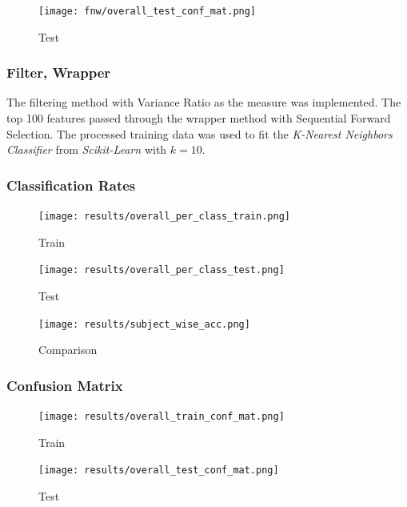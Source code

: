 \documentclass[12pt,twoside,a4paper]{article}
\begin{document}
\begin{figure}[H]
    \centering
    \texttt{[image: fnw/overall\_test\_conf\_mat.png]}
    \caption{Test}
    \label{fig: F5}
\end{figure}

\subsubsection{Filter, Wrapper}

The filtering method with Variance Ratio as the measure was implemented. The top 100 features passed through the wrapper method with Sequential Forward Selection. The processed training data was used to fit the \textit{K-Nearest Neighbors Classifier} from \textit{Scikit-Learn} with $k=10$.

\subsubsection*{Classification Rates}

\begin{figure}[H]
    \centering
    \texttt{[image: results/overall\_per\_class\_train.png]}
    \caption{Train}
    \label{fig: FW1}
\end{figure}

\begin{figure}[H]
    \centering
    \texttt{[image: results/overall\_per\_class\_test.png]}
    \caption{Test}
    \label{fig: FW2}
\end{figure}

\begin{figure}[H]
    \centering
    \texttt{[image: results/subject\_wise\_acc.png]}
    \caption{Comparison}
    \label{fig: FW3}
\end{figure}

\subsubsection*{Confusion Matrix}

\begin{figure}[H]
    \centering
    \texttt{[image: results/overall\_train\_conf\_mat.png]}
    \caption{Train}
    \label{fig: FW4}
\end{figure}

\begin{figure}[H]
    \centering
    \texttt{[image: results/overall\_test\_conf\_mat.png]}
    \caption{Test}
    \label{fig: FW5}
\end{figure}
\end{document}

